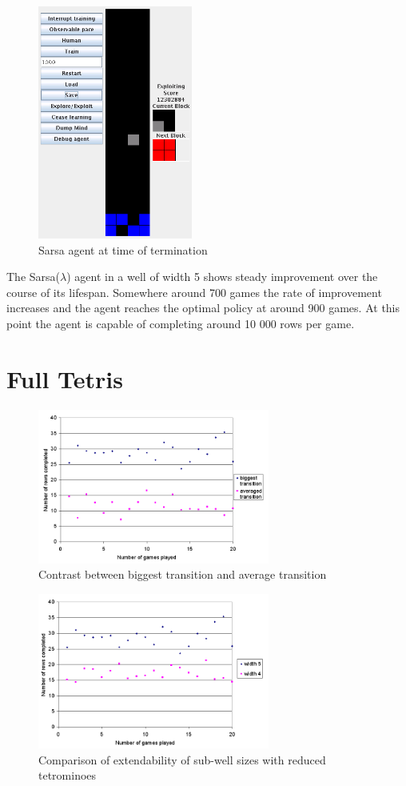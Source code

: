 \documentclass{rucsthesis}
\begin{document}
\begin{figure}[h]
\centering
\includegraphics[width=2in]{sarsaelig4term.png}
\caption{Sarsa agent at time of termination}
\label{fig:sarsaelig4term}
\end{figure}

The Sarsa($\lambda$) agent in a well of width 5 shows steady improvement over the course of its lifespan. Somewhere around 700 games the rate of improvement increases and the agent reaches the optimal policy at around 900 games. At this point the agent is capable of completing around 10 000 rows per game.

\chapter{Full Tetris}

\begin{figure}[h]
\centering
\includegraphics[width=3in]{multisingle.png}
\caption{Contrast between biggest transition and average transition}
\label{fig:multisingle}
\end{figure}

\begin{figure}[h]
\centering
\includegraphics[width=3in]{widthcomparrison.png}
\caption{Comparison of extendability of sub-well sizes with reduced tetrominoes}
\label{fig:widthcomparrison}
\end{figure}
\end{document}
